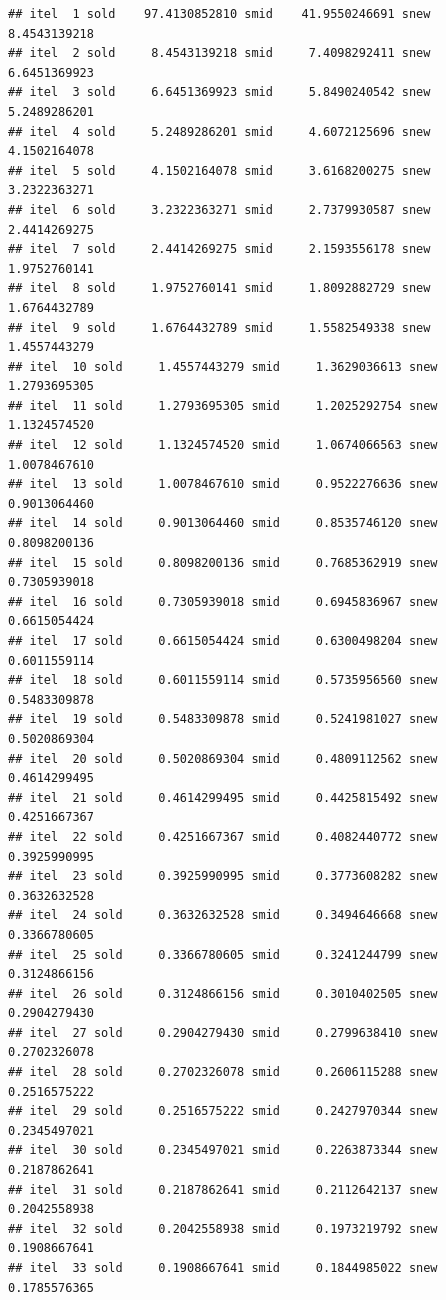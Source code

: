 \documentclass[
  12pt,
]{article}
\begin{document}
\begin{verbatim}
## itel  1 sold    97.4130852810 smid    41.9550246691 snew     8.4543139218 
## itel  2 sold     8.4543139218 smid     7.4098292411 snew     6.6451369923 
## itel  3 sold     6.6451369923 smid     5.8490240542 snew     5.2489286201 
## itel  4 sold     5.2489286201 smid     4.6072125696 snew     4.1502164078 
## itel  5 sold     4.1502164078 smid     3.6168200275 snew     3.2322363271 
## itel  6 sold     3.2322363271 smid     2.7379930587 snew     2.4414269275 
## itel  7 sold     2.4414269275 smid     2.1593556178 snew     1.9752760141 
## itel  8 sold     1.9752760141 smid     1.8092882729 snew     1.6764432789 
## itel  9 sold     1.6764432789 smid     1.5582549338 snew     1.4557443279 
## itel  10 sold     1.4557443279 smid     1.3629036613 snew     1.2793695305 
## itel  11 sold     1.2793695305 smid     1.2025292754 snew     1.1324574520 
## itel  12 sold     1.1324574520 smid     1.0674066563 snew     1.0078467610 
## itel  13 sold     1.0078467610 smid     0.9522276636 snew     0.9013064460 
## itel  14 sold     0.9013064460 smid     0.8535746120 snew     0.8098200136 
## itel  15 sold     0.8098200136 smid     0.7685362919 snew     0.7305939018 
## itel  16 sold     0.7305939018 smid     0.6945836967 snew     0.6615054424 
## itel  17 sold     0.6615054424 smid     0.6300498204 snew     0.6011559114 
## itel  18 sold     0.6011559114 smid     0.5735956560 snew     0.5483309878 
## itel  19 sold     0.5483309878 smid     0.5241981027 snew     0.5020869304 
## itel  20 sold     0.5020869304 smid     0.4809112562 snew     0.4614299495 
## itel  21 sold     0.4614299495 smid     0.4425815492 snew     0.4251667367 
## itel  22 sold     0.4251667367 smid     0.4082440772 snew     0.3925990995 
## itel  23 sold     0.3925990995 smid     0.3773608282 snew     0.3632632528 
## itel  24 sold     0.3632632528 smid     0.3494646668 snew     0.3366780605 
## itel  25 sold     0.3366780605 smid     0.3241244799 snew     0.3124866156 
## itel  26 sold     0.3124866156 smid     0.3010402505 snew     0.2904279430 
## itel  27 sold     0.2904279430 smid     0.2799638410 snew     0.2702326078 
## itel  28 sold     0.2702326078 smid     0.2606115288 snew     0.2516575222 
## itel  29 sold     0.2516575222 smid     0.2427970344 snew     0.2345497021 
## itel  30 sold     0.2345497021 smid     0.2263873344 snew     0.2187862641 
## itel  31 sold     0.2187862641 smid     0.2112642137 snew     0.2042558938 
## itel  32 sold     0.2042558938 smid     0.1973219792 snew     0.1908667641 
## itel  33 sold     0.1908667641 smid     0.1844985022 snew     0.1785576365 

\end{verbatim}
\end{document}
